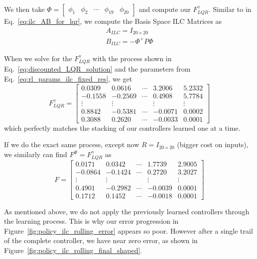 We then take $\Phi = \begin{bmatrix}\phi_1 & \phi_2 & \cdots & \phi_{19} & \phi_{20}\end{bmatrix}$ and compute our $F_{LQR}^\gamma$. Similar to in Eq.~\ref{eq:ilc_AB_for_lqr}, we compute the Basis Space ILC Matrices as
\begin{equation}
    \begin{split}
        A_{ILC} = I_{20 \times 20} \\
        B_{ILC} = -\Phi^+ P \Phi
    \end{split}
\end{equation}

When we solve for the $F_{LQR}^\gamma$ with the process shown in Eq.~\ref{eq:discounted_LQR_solution} and the parameters from Eq.~\ref{eq:rl_params_ilc_fixed_res}, we get
\begin{equation}
    F_{LQR}^\gamma
    = 
    \begin{bmatrix}
        0.0309  &  0.0616 & \cdots & 3.2006  &  5.2332 \\
        -0.1558 &  -0.2569 & \cdots & 0.4908  &  5.7784 \\
        \vdots & \vdots & & \vdots & \vdots \\
        0.8842 &  -0.5381& \cdots & -0.0071  &  0.0002 \\
        0.3088&    0.2620& \cdots & -0.0033  &  0.0001 
    \end{bmatrix}
\end{equation}
which perfectly matches the stacking of our controllers learned one at a time.

If we do the exact same process, except now $R = I_{20 \times 20}$ (bigger cost on inputs), we similarly can find $F^\Phi = F_{LQR}^\gamma$ as
\begin{equation}
    F
    = 
    \begin{bmatrix}
        0.0171  &  0.0342 & \cdots &   1.7739 &   2.9005\\
        -0.0864  & -0.1424  & \cdots &  0.2720 &   3.2027\\
        \vdots & \vdots & & \vdots & \vdots \\
        0.4901 &  -0.2982  & \cdots & -0.0039 &   0.0001\\
        0.1712  &  0.1452  & \cdots & -0.0018  &  0.0001
    \end{bmatrix}
\end{equation}

As mentioned above, we do not apply the previously learned controllers through the learning process. This is why our error progression in Figure~\ref{fig:policy_ilc_rolling_error} appears so poor. However after a single trail of the complete controller, we have near zero error, as shown in Figure~\ref{fig:policy_ilc_rolling_final_shaped}.

